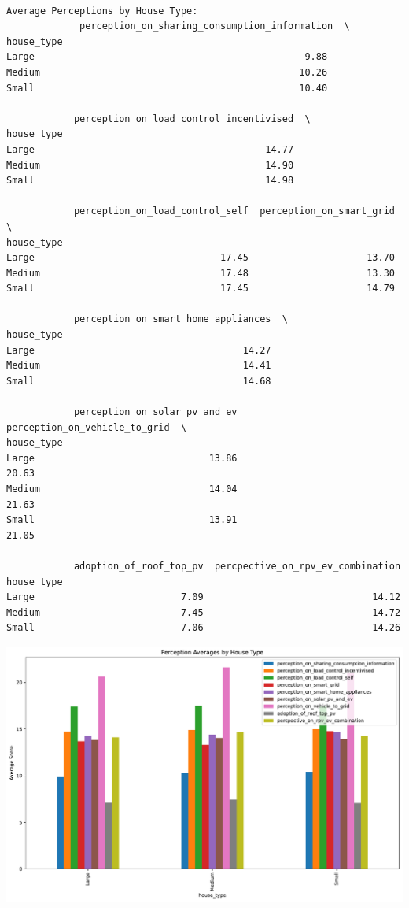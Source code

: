 \documentclass[
  letterpaper,
  DIV=11,
  numbers=noendperiod]{scrartcl}
\begin{document}
\begin{verbatim}

Average Perceptions by House Type:
             perception_on_sharing_consumption_information  \
house_type                                                  
Large                                                9.88   
Medium                                              10.26   
Small                                               10.40   

            perception_on_load_control_incentivised  \
house_type                                            
Large                                         14.77   
Medium                                        14.90   
Small                                         14.98   

            perception_on_load_control_self  perception_on_smart_grid  \
house_type                                                              
Large                                 17.45                     13.70   
Medium                                17.48                     13.30   
Small                                 17.45                     14.79   

            perception_on_smart_home_appliances  \
house_type                                        
Large                                     14.27   
Medium                                    14.41   
Small                                     14.68   

            perception_on_solar_pv_and_ev  perception_on_vehicle_to_grid  \
house_type                                                                 
Large                               13.86                          20.63   
Medium                              14.04                          21.63   
Small                               13.91                          21.05   

            adoption_of_roof_top_pv  percpective_on_rpv_ev_combination  
house_type                                                              
Large                          7.09                              14.12  
Medium                         7.45                              14.72  
Small                          7.06                              14.26  
\end{verbatim}

\includegraphics{index_files/figure-pdf/cell-10-output-2.pdf}
\end{document}
